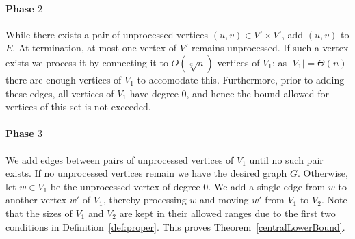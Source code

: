\paragraph{Phase $2$}
While there exists a pair of unprocessed vertices $(u,v)\in V'\times V'$, add $(u,v)$ to $E$. At termination, at most one vertex of $V'$ remains unprocessed. If such a vertex exists we process it by connecting it to $O(\sqrt[\alpha]n)$ vertices of $V_1$; as $\vert V_1\vert = \Theta(n)$ there are enough vertices of $V_1$ to accomodate this. Furthermore, prior to adding these edges, all vertices of $V_1$ have degree $0$, and hence the bound allowed for vertices of this set is not exceeded.

\paragraph{Phase $3$}
We add edges between pairs of unprocessed vertices of $V_1$ until no such pair exists. If no unprocessed vertices remain we have the desired graph $G$. Otherwise, let $w\in V_1$ be the unprocessed vertex of degree $0$. We add a single edge from $w$ to another vertex $w'$ of $V_1$, thereby processing $w$ and moving $w'$ from $V_1$ to $V_2$. Note that the sizes of $V_1$ and $V_2$ are kept in their allowed ranges due to the first two conditions in Definition~\ref{def:proper}. This proves Theorem~\ref{centralLowerBound}.
